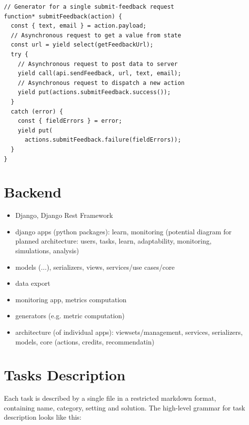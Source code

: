 
\begin{lstlisting}[language=ES6]
// Generator for a single submit-feedback request
function* submitFeedback(action) {
  const { text, email } = action.payload;
  // Asynchronous request to get a value from state
  const url = yield select(getFeedbackUrl);
  try {
    // Asynchronous request to post data to server
    yield call(api.sendFeedback, url, text, email);
    // Asynchronous request to dispatch a new action
    yield put(actions.submitFeedback.success());
  }
  catch (error) {
    const { fieldErrors } = error;
    yield put(
      actions.submitFeedback.failure(fieldErrors));
  }
}
\end{lstlisting}



\section{Backend}

\begin{itemize}
\item Django, Django Rest Framework
\item django apps (python packages): learn, monitoring (potential diagram for planned architecture: users, tasks, learn, adaptability, monitoring, simulations, analysis)
\item models (...), serializers, views, services/use cases/core
\item data export
\item monitoring app, metrics computation
\item generators (e.g. metric computation)
\item architecture (of individual apps): viewsets/management, services, serializers, models, core (actions, credits, recommendatin)
\end{itemize}


\section{Tasks Description}

Each task is described by a single file in a restricted markdown format,
containing name, category, setting and solution.
The high-level grammar for task description looks like this:

